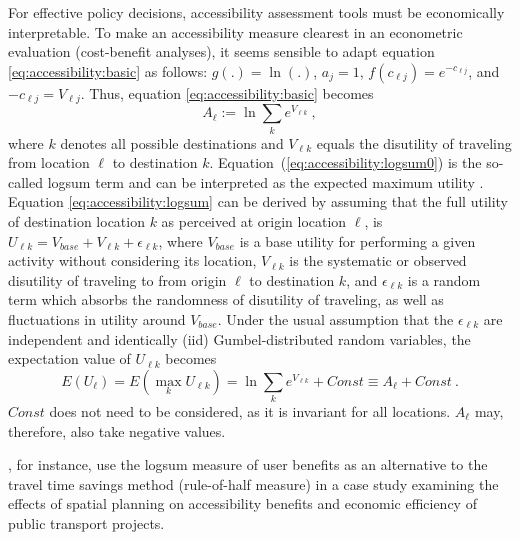 For effective policy decisions, accessibility assessment tools must be economically interpretable.
To make an accessibility measure clearest in an econometric evaluation (\eg cost-benefit 
analyses), it seems sensible to adapt equation \ref{eq:accessibility:basic} as 
follows: $g(.) = \ln(.)$, $a_j = 1$, $f(c_{\ell j}) = e^{-c_{\ell j}}$, and $-c_{\ell j} = V_{\ell j}$. Thus, 
equation \ref{eq:accessibility:basic} becomes
\begin{equation}
	A_\ell := \ln \sum_k e^{V_{\ell k}} \ ,
	\label{eq:accessibility:logsum}
\end{equation}
where $k$ denotes all possible destinations and $V_{\ell k}$ equals the disutility of traveling from location $\ell$
to destination $k$. Equation~(\ref{eq:accessibility:logsum0}) is the so-called \gls{logsum} term and can be interpreted
as the expected maximum utility \citep[e.g.,][]{BenAkivaLerman_1985, DejongEtc2005LogsumAsEvalDutchReport}. Equation
\ref{eq:accessibility:logsum} can be derived by assuming that the full utility of destination location $k$ as
perceived at origin location $\ell$, is $U_{\ell k} = V_{base} + V_{\ell k} + \epsilon_{\ell k}$,
where $V_{base}$ is a base utility for performing a given activity without considering its location,
$V_{\ell k}$ is the systematic or observed disutility of traveling to from origin $\ell$ to destination $k$,
and $\epsilon_{\ell k}$ is a random term which absorbs the randomness of disutility of traveling, as well as
fluctuations in utility around $V_{base}$. Under the usual assumption that the $\epsilon_{\ell k}$ are
independent and identically (iid) Gumbel-distributed random variables, the expectation value of $U_{\ell k}$ becomes
\begin{equation}
	E(U_\ell) = E(\max_k U_{\ell k}) = \ln \sum_k e^{V_{\ell k}} + Const \equiv A_\ell + Const \ .
\end{equation}
$Const$ does not need to be considered, as it is invariant for all locations. $A_\ell$ may, therefore, also
take negative values.

\citet{GeursEtAl2012AccessibilityBenefitsNetherlands}, for instance, use the \gls{logsum} measure of user benefits 
as an alternative to the travel time savings method (\ie rule-of-half measure) in a case study 
examining the effects of spatial planning on accessibility benefits and economic efficiency of public 
transport projects.

